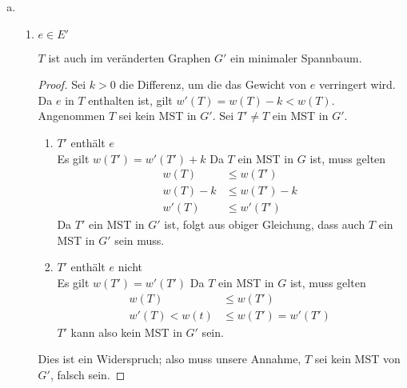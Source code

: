 \documentclass[a4paper]{scrartcl}
\begin{document}
\begin{enumerate}[(a)]
    \item
        \begin{enumerate}[1.]
            \item $e \in E'$
                \begin{behaupt}
                    $T$ ist auch im veränderten Graphen $G'$ ein minimaler
                    Spannbaum.
                \end{behaupt}
                \begin{proof}
                    Sei $k > 0$ die Differenz, um die das Gewicht von $e$
                    verringert wird.
                    Da $e$ in $T$ enthalten ist, gilt $w'(T) = w(T) - k < w(T)$.
                    Angenommen $T$ sei kein MST in $G'$.
                    Sei $T' \neq T$ ein MST in $G'$.
                    \begin{enumerate}
                        \item $T'$ enthält $e$ \\
                            Es gilt $w(T') = w'(T') + k$
                            Da $T$ ein MST in $G$ ist, muss gelten
                            \begin{equation}
                                \begin{split}
                                    w(T) &\leq w(T') \\
                                    w(T) - k &\leq w(T') - k \\
                                    w'(T) &\leq w'(T')
                                \end{split}
                            \end{equation}
                            Da $T'$ ein MST in $G'$ ist, folgt aus obiger
                            Gleichung, dass auch $T$ ein MST in $G'$ sein muss.
                            
                        \item $T'$ enthält $e$ nicht \\
                            Es gilt $w(T') = w'(T')$
                            Da $T$ ein MST in $G$ ist, muss gelten
                            \begin{equation}
                                \begin{split}
                                    w(T) &\leq w(T') \\
                                    w'(T) < w(t) &\leq w(T') = w'(T')
                                \end{split}
                            \end{equation}
                            $T'$ kann also kein MST in $G'$ sein.
                    \end{enumerate}
                    Dies ist ein Widerspruch; also muss unsere Annahme, $T$ sei
                    kein MST von $G'$, falsch sein.


\end{proof}
\end{enumerate}
\end{enumerate}
\end{document}
